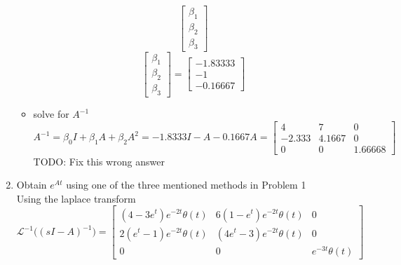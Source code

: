 \begin{enumerate}
\begin{itemize}
\begin{equation}
        \begin{bmatrix}
          \beta_1 \\
          \beta_2 \\
          \beta_3 
        \end{bmatrix}
      \end{equation}
      \begin{equation}
        \begin{bmatrix}
          \beta_1 \\
          \beta_2 \\
          \beta_3 
        \end{bmatrix} = 
        \begin{bmatrix}
          -1.83333 \\
          -1 \\
          -0.16667
        \end{bmatrix}
      \end{equation}
    \item solve for $A^{-1}$
      \begin{equation}
        A^{-1} =
        \beta_0I + \beta_1A + \beta_2A^2 =
        -1.8333I - A - 0.1667A =
        \begin{bmatrix}
          4 & 7 & 0 \\
          -2.333 & 4.1667 & 0 \\
          0 & 0 & 1.66668
        \end{bmatrix}
      \end{equation}
      {\LARGE \color{red} TODO: Fix this wrong answer}
    \end{itemize}
  \item Obtain $e^{At}$ using one of the three mentioned methods in Problem 1 \\
    Using the laplace transform
    \begin{equation}
\mathscr{L}^{-1}\Big ((sI-A)^{-1}\Big ) = \left[\begin{matrix}\left(4 - 3 e^{t}\right) e^{- 2 t} \theta\left(t\right) & 6 \left(1 - e^{t}\right) e^{- 2 t} \theta\left(t\right) & 0\\2 \left(e^{t} - 1\right) e^{- 2 t} \theta\left(t\right) & \left(4 e^{t} - 3\right) e^{- 2 t} \theta\left(t\right) & 0\\0 & 0 & e^{- 3 t} \theta\left(t\right)\end{matrix}\right]\end{equation}

  \end{enumerate}